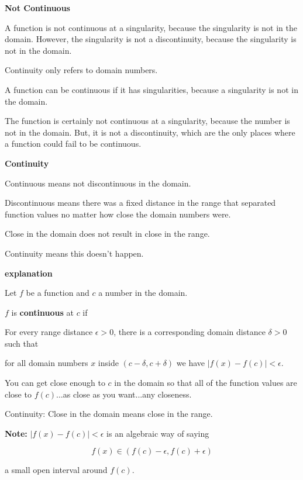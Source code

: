 \documentclass{ximera}
\begin{document}
\begin{warning} \textbf{\textcolor{red!70!black}{Not Continuous}}


A function is not continuous at a singularity, because the singularity is not in the domain.  However, the singularity is not a discontinuity, because the singularity is not in the domain. 

Continuity only refers to domain numbers.

A function can be continuous if it has singularities, because a singularity is not in the domain.

The function is certainly not continuous at a singularity, because the number is not in the domain. But, it is not a discontinuity, which are the only places where a function could fail to be continuous.



\end{warning}





\begin{idea} \textbf{\textcolor{blue!55!black}{Continuity}}


Continuous means not discontinuous in the domain. 

Discontinuous means there was a fixed distance in the range that separated function values no matter how close the domain numbers were. 

Close in the domain does not result in close in the range.

Continuity means this doesn't happen. 




\textbf{\textcolor{red!75!green}{explanation}} 

Let $f$ be a function and $c$ a number in the domain. 

$f$ is \textbf{continuous} at $c$ if  


For every range distance $\epsilon > 0 $, there is a corresponding domain distance $\delta > 0$ such that 


for all domain numbers $x$ inside $(c - \delta, c + \delta)$ we have $| f(x) - f(c) | < \epsilon$. 




You can get close enough to $c$ in the domain so that all of the function values are close to $f(c)$...as close as you want...any closeness. 



Continuity: Close in the domain means close in the range.



\textbf{Note:} $| f(x) - f(c) | < \epsilon$ is an algebraic way of saying  

\[  f(x) \in (f(c) - \epsilon, f(c) + \epsilon)  \]

a small open interval around $f(c)$.



\end{idea}
\end{document}
